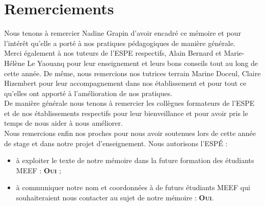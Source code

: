\section*{Remerciements}
Nous tenons à remercier Nadine Grapin d'avoir encadré ce mémoire et pour l'intérêt qu'elle a porté à nos pratiques pédagogiques de manière générale.\\
Merci également à nos tuteurs de l'ESPE respectifs, Alain Bernard et Marie-Hélène Le Yaouanq pour leur enseignement et leurs bons conseils tout au long de cette année. De même, nous remercions nos tutrices terrain  Marine Doceul, Claire Hizembert pour leur accompagnement dans nos établissement et pour tout ce qu'elles ont apporté à l'amélioration de nos pratiques.\\
De manière générale nous tenons à remercier les collègues formateurs de l'ESPE et de nos établissements respectifs pour leur bienveillance et pour avoir pris le temps de nous aider à nous améliorer.\\
Nous remercions enfin nos proches pour nous avoir soutenues lors de cette année de stage et dans notre projet d'enseignement.
\vfill
Nous autorisons l'ESPÉ :
\begin{itemize}
\item à exploiter le texte de notre mémoire dans la future formation des étudiants MEEF : \textbf{\textsc{Oui}} ;
\item à communiquer notre nom et coordonnées à de futurs étudiants MEEF qui souhaiteraient nous contacter au sujet de notre mémoire : \textbf{\textsc{Oui}}.
\end{itemize}
